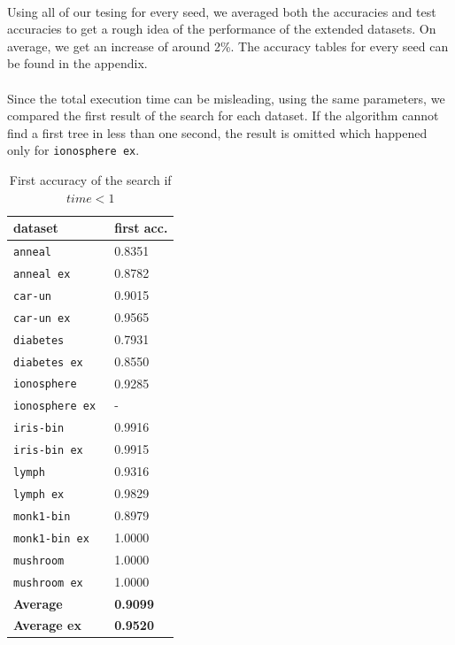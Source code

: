 \documentclass[12pt]{report}
\theoremstyle{definition}
\theoremstyle{definition}
\theoremstyle{definition}
\begin{document}
\paragraph{} Using all of our tesing for every seed, we averaged both the accuracies and test accuracies to get a rough idea
of the performance of the extended datasets. On average, we get an increase of around 2\%. The accuracy tables for every
seed can be found in the appendix.

\newpage

\paragraph{} Since the total execution time can be misleading, using the same parameters, we compared the first result
of the search for each dataset. If the algorithm cannot find a first tree in less than one second, the result is
omitted which happened only for \texttt{ionosphere ex}.

\begin{table}[ht]
    \centering
    \begin{tabular}{L{3.5cm} R{1.8cm}}
        \hline
        \bf dataset & \bf first acc. \\
        \hline
        \tt anneal & 0.8351 \\
        \tt anneal ex & 0.8782 \\
        \tt car-un & 0.9015 \\
        \tt car-un ex & 0.9565 \\
        \tt diabetes & 0.7931 \\
        \tt diabetes ex & 0.8550 \\
        \tt ionosphere & 0.9285 \\
        \tt ionosphere ex & - \\
        \tt iris-bin & 0.9916 \\
        \tt iris-bin ex & 0.9915 \\
        \tt lymph & 0.9316 \\
        \tt lymph ex & 0.9829 \\
        \tt monk1-bin & 0.8979 \\
        \tt monk1-bin ex & 1.0000 \\
        \tt mushroom & 1.0000 \\
        \tt mushroom ex & 1.0000 \\
        \hline
        \bf Average & \bf 0.9099 \\
        \hline
        \bf Average ex & \bf 0.9520 \\
        \hline
    \end{tabular}
    \caption{First accuracy of the search if $time<1$}
    \label{fig:firstacc}
\end{table}
\end{document}
